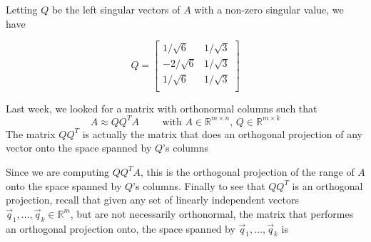 Letting $Q$ be the left singular vectors of $A$ with a non-zero singular value, we have

\begin{equation*}
    Q =
    \begin{bmatrix}
    1/ \sqrt{6} & 1/\sqrt{3}\\
    -2/\sqrt{6} & 1/\sqrt{3}\\
    1/ \sqrt{6} & 1/\sqrt{3}\\
    \end{bmatrix}
\end{equation*}


Last week, we looked for a matrix with orthonormal columns such that
\begin{equation*}
    A \approx QQ^TA \qquad \text{ with } A\in\mathbb{R}^{m\times n},\, Q \in \mathbb{R}^{m\times k}
\end{equation*}
The matrix $QQ^T$ is actually the matrix that does an orthogonal projection of any vector onto the space spanned by $Q$'s columns


\vspace{0.5cm}
\begin{center}
        \end{center}
\vspace{0.5cm}

Since we are computing $QQ^TA$, this is the orthogonal projection of the range of $A$ onto the space spanned by $Q$'s columns. Finally to see that $QQ^T$ is an orthogonal projection, recall that given any set of linearly independent vectors $\vec{q}_1, \ldots, \vec{q}_k \in \mathbb{R}^m$, but are not necessarily orthonormal, the matrix that performes an orthogonal projection onto, the space spanned by $\vec{q}_1, \ldots, \vec{q}_k$ is

